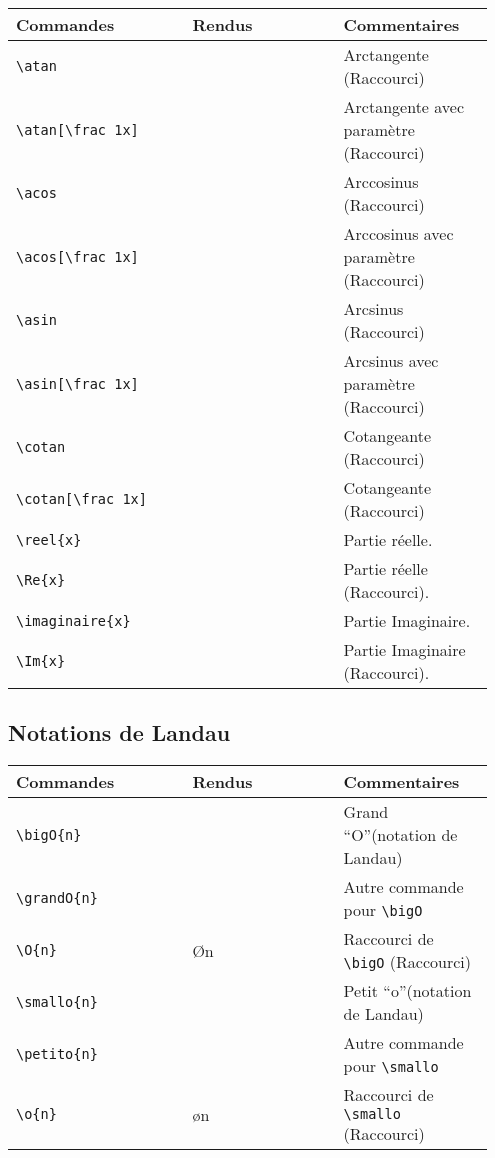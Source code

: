 \documentclass[a4paper,10pt]{article}
\newcommand{\rac}{({\color{red}Raccourci})}
\begin{document}
			\noindent
			\begin{tabular}{|p{0.35\linewidth}|p{0.3\linewidth}|p{0.3\linewidth}|}
				\hline
					\textbf{Commandes}&\textbf{Rendus}&\textbf{Commentaires}
				\\\hline\hline
					\verb!\atan!		&	\atan			&	Arctangente \rac
				\\\hline
					\verb!\atan[\frac 1x]!		&	\atan[\frac 1x]		&	Arctangente avec paramètre \rac
				\\\hline
					\verb!\acos!		&	\acos			&	Arccosinus \rac
				\\\hline
					\verb!\acos[\frac 1x]!		&	\acos[\frac 1x]		&	Arccosinus avec paramètre \rac
				\\\hline
					\verb!\asin!		&	\asin			&	Arcsinus \rac
				\\\hline
					\verb!\asin[\frac 1x]!		&	\asin[\frac 1x]		&	Arcsinus avec paramètre \rac
				\\\hline
					\verb!\cotan!		&	\cotan			&	Cotangeante \rac
				\\\hline
					\verb!\cotan[\frac 1x]!		&	\cotan[\frac 1x]			&	Cotangeante \rac
				\\\hline
					\verb!\reel{x}!			&	\reel{x}	&	Partie réelle.
				\\\hline
					\verb!\Re{x}!			&	\Re{x}		&	Partie réelle \rac.
				\\\hline
					\verb!\imaginaire{x}!		&	\imaginaire{x}	&	Partie Imaginaire.
				\\\hline
					\verb!\Im{x}!			&	\Im{x}		&	Partie Imaginaire \rac.
				\\\hline
			\end{tabular}
					
		\subsection{Notations de Landau}

			\noindent
			\begin{tabular}{|p{0.35\linewidth}|p{0.3\linewidth}|p{0.3\linewidth}|}
				\hline
					\textbf{Commandes}&\textbf{Rendus}&\textbf{Commentaires}
				\\\hline\hline
					\verb!\bigO{n}!		&	\bigO{n}			&	Grand ``O''(notation de Landau)
				\\\hline
					\verb!\grandO{n}!	&	\grandO{n}			&	Autre commande pour \verb!\bigO!
				\\\hline
					\verb!\O{n}!		&	\O{n}				&	Raccourci de \verb!\bigO! \rac
				\\\hline
					\verb!\smallo{n}!	&	\smallo{n}			&	Petit ``o''(notation de Landau)
				\\\hline
					\verb!\petito{n}!	&	\petito{n}			&	Autre commande pour \verb!\smallo!
				\\\hline
					\verb!\o{n}!		&	\o{n}				&	Raccourci de \verb!\smallo! \rac
				\\\hline
			\end{tabular}
			
\end{document}
